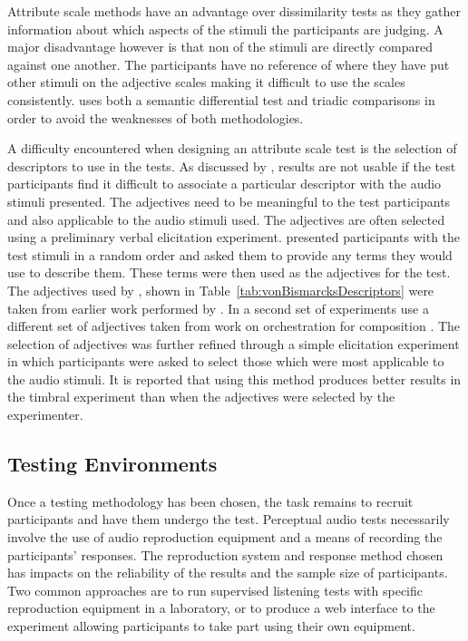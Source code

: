 			Attribute scale methods have an advantage over dissimilarity tests as they gather information about
			which aspects of the stimuli the participants are judging. A major disadvantage however is that non
			of the stimuli are directly compared against one another. The participants have no reference of
			where they have put other stimuli on the adjective scales making it difficult to use the scales
			consistently. \citet{marui2005constructing} uses both a semantic differential test and triadic
			comparisons in order to avoid the weaknesses of both methodologies. 

			A difficulty encountered when designing an attribute scale test is the selection of descriptors to
			use in the tests. As discussed by \citet{darke2005assessment}, results are not usable if the test
			participants find it difficult to associate a particular descriptor with the audio stimuli
			presented. The adjectives need to be meaningful to the test participants and also applicable to the
			audio stimuli used. The adjectives are often selected using a preliminary verbal elicitation
			experiment. \citet{namba1991verbal} presented participants with the test stimuli in a random order
			and asked them to provide any terms they would use to describe them. These terms were then used as
			the adjectives for the test. The adjectives used by \citet{kendall1993verbal1}, shown in
			Table~\ref{tab:vonBismarcksDescriptors} were taken from earlier work performed by
			\citet{vonbismarck1974timbre}. In a second set of experiments \citet{kendall1993verbal2} use a
			different set of adjectives taken from work on orchestration for composition
			\citet{piston1955orchestration}. The selection of adjectives was further refined through a simple
			elicitation experiment in which participants were asked to select those which were most applicable
			to the audio stimuli. It is reported that using this method produces better results in the timbral
			experiment than when the adjectives were selected by the experimenter.

	\subsection{Testing Environments}
	\label{sec:Timbre-ListeningTests-Environments}
		Once a testing methodology has been chosen, the task remains to recruit participants and have them
		undergo the test. Perceptual audio tests necessarily involve the use of audio reproduction equipment and a
		means of recording the participants' responses. The reproduction system and response method chosen has
		impacts on the reliability of the results and the sample size of participants. Two common approaches are to
		run supervised listening tests with specific reproduction equipment in a laboratory, or to produce a web
		interface to the experiment allowing participants to take part using their own equipment.

